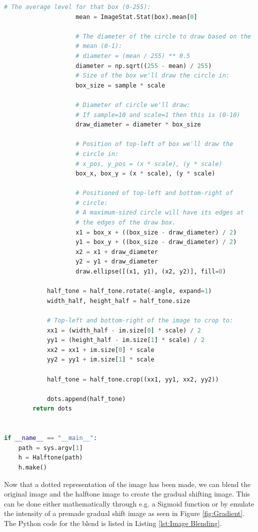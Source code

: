 \documentclass[%
]{USN-MSc}
\begin{document}
\begin{lstlisting}[language=Python, caption=Gray-scale Halftone., label={lst:Gray-scale Halftone}]
                    # The average level for that box (0-255):
                    mean = ImageStat.Stat(box).mean[0]

                    # The diameter of the circle to draw based on the 
                    # mean (0-1):
                    # diameter = (mean / 255) ** 0.5
                    diameter = np.sqrt((255 - mean) / 255)
                    # Size of the box we'll draw the circle in:
                    box_size = sample * scale

                    # Diameter of circle we'll draw:
                    # If sample=10 and scale=1 then this is (0-10)
                    draw_diameter = diameter * box_size

                    # Position of top-left of box we'll draw the 
                    # circle in:
                    # x_pos, y_pos = (x * scale), (y * scale)
                    box_x, box_y = (x * scale), (y * scale)

                    # Positioned of top-left and bottom-right of 
                    # circle:
                    # A maximum-sized circle will have its edges at 
                    # the edges of the draw box.
                    x1 = box_x + ((box_size - draw_diameter) / 2)
                    y1 = box_y + ((box_size - draw_diameter) / 2)
                    x2 = x1 + draw_diameter
                    y2 = y1 + draw_diameter
                    draw.ellipse([(x1, y1), (x2, y2)], fill=0)

            half_tone = half_tone.rotate(-angle, expand=1)
            width_half, height_half = half_tone.size

            # Top-left and bottom-right of the image to crop to:
            xx1 = (width_half - im.size[0] * scale) / 2
            yy1 = (height_half - im.size[1] * scale) / 2
            xx2 = xx1 + im.size[0] * scale
            yy2 = yy1 + im.size[1] * scale

            half_tone = half_tone.crop((xx1, yy1, xx2, yy2))

            dots.append(half_tone)
        return dots


if __name__ == "__main__":
    path = sys.argv[1]
    h = Halftone(path)
    h.make()

\end{lstlisting}

Now that a dotted representation of the image has been made, we can blend the original image and the halftone image to create the gradual shifting image. This can be done either mathematically through e.g. a Sigmoid function or by emulate the intensity of a premade gradual shift image as seen in Figure \ref{fig:Gradient}. The Python code for the blend is listed in Listing \ref{lst:Image Blending}.
\end{document}
